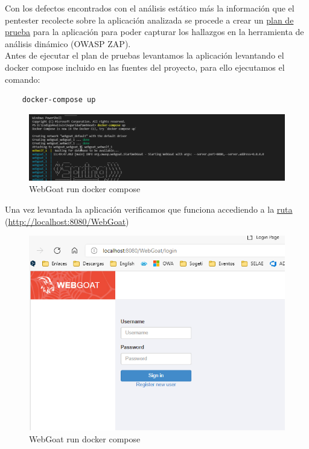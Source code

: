 Con los defectos encontrados con el análisis estático más la información que el pentester recolecte sobre la aplicación analizada 
se procede a crear un \href{https://github.com/M0l1n3ta/PFG/blob/master/Scripts/Plan Pruebas/PlanPruebas_OWASP_WebGoat.ps1}{plan de prueba} para la aplicación para poder capturar los hallazgos en la herramienta de análisis 
dinámico (OWASP ZAP).\\

\newpage
Antes de ejecutar el plan de pruebas levantamos la aplicación levantando el docker compose incluido en las fuentes del proyecto, 
para ello ejecutamos el comando:

\begin{verbatim}
    docker-compose up
\end{verbatim}

\begin{figure}[!htb]
    \captionsetup{width=1\linewidth}  
    \includegraphics[width=\linewidth]{./imagenes/04_1_1_00_WebGoat_DockerComposeUP.png}
    \caption{WebGoat run docker compose}  
\end{figure}

Una vez levantada la aplicación verificamos que funciona accediendo a la \href{http://localhost:8080/WebGoat}{ruta} (\url{http://localhost:8080/WebGoat})

\begin{figure}[!htb]
    \centering
    \captionsetup{width=1\linewidth}  
    \includegraphics[width=0.8\linewidth]{./imagenes/04_1_1_01_WebGoat_APPRunning.png}
    \caption{WebGoat run docker compose}  
\end{figure}

